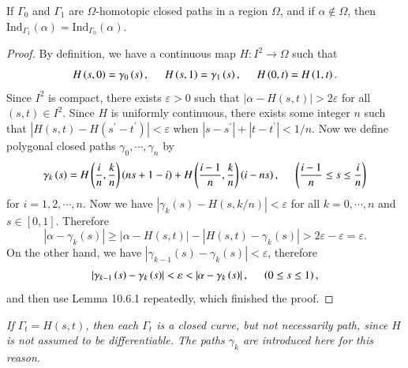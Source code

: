 \begin{theorem}
If $\Gamma_0$ and $\Gamma_1$ are $\Omega$-homotopic closed paths in a region $\Omega$, and if $\alpha\notin\Omega$, then $\mathrm{Ind}_{\Gamma_1}(\alpha)=\mathrm{Ind}_{\Gamma_0}(\alpha)$.
\end{theorem}
\begin{proof}
By definition, we have a continuous map $H:I^2\to\Omega$ such that 
$$
H\left( s,0 \right) =\gamma _0\left( s \right) ,\hspace{0.5cm}H\left( s,1 \right) =\gamma _1\left( s \right) ,\hspace{0.5cm}H\left( 0,t \right) =H\left( 1,t \right) .
$$
Since $I^2$ is compact, there exists $\varepsilon>0$ such that $|\alpha-H(s,t)|>2\varepsilon$ for all $(s,t)\in I^2$. Since $H$ is uniformly continuous, there exists some integer $n$ such that $|H(s,t)-H(s^\prime-t^\prime)|<\varepsilon$ when $|s-s^\prime|+|t-t^\prime|<1/n$. Now we define polygonal closed paths $\gamma_0,\cdots,\gamma_n$ by 
$$
\gamma _k\left( s \right) =H\left( \frac{i}{n},\frac{k}{n} \right) \left( ns+1-i \right) +H\left( \frac{i-1}{n},\frac{k}{n} \right) \left( i-ns \right) ,\hspace{0.5cm}\left( \frac{i-1}{n}\le s\le \frac{i}{n} \right) 
$$
for $i=1,2,\cdots,n$. Now we have $|\gamma_k(s)-H(s,k/n)|<\varepsilon$ for all $k=0,\cdots,n$ and $s\in[0,1]$. Therefore 
$$
\left| \alpha -\gamma _k\left( s \right) \right|\ge \left| \alpha -H\left( s,t \right) \right|-\left| H\left( s,t \right) -\gamma _k\left( s \right) \right|>2\varepsilon -\varepsilon =\varepsilon .
$$
On the other hand, we have $\left| \gamma _{k-1}\left( s \right) -\gamma _k\left( s \right) \right|<\varepsilon $, therefore 
$$
\left| \gamma _{k-1}\left( s \right) -\gamma _k\left( s \right) \right|<\varepsilon <\left| \alpha -\gamma _k\left( s \right) \right|,\hspace{0.5cm}\left( 0\le s\le 1 \right) ,
$$
and then use Lemma 10.6.1 repeatedly, which finished the proof.
\end{proof}
\begin{note}\em
If $\Gamma_t=H(s,t)$, then each $\Gamma_t$ is a closed \textit{curve}, but not necessarily \textit{path}, since $H$ is not assumed to be differentiable. The paths $\gamma_k$ are introduced here for this reason.
\end{note}
